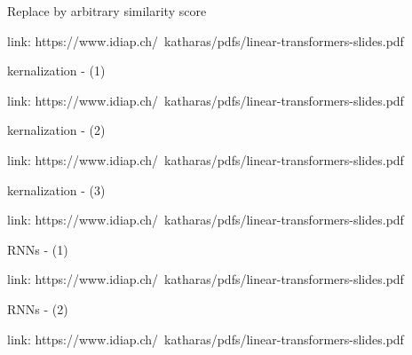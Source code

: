 \documentclass[10pt]{beamer}
\begin{document}
\begin{frame}{Replace by arbitrary similarity score}

    \begin{figure}
        \begin{center}
        \end{center}
    \end{figure}
    link: https://www.idiap.ch/~katharas/pdfs/linear-transformers-slides.pdf
\end{frame}

\begin{frame}{kernalization - (1)}

    \begin{figure}
        \begin{center}
        \end{center}
    \end{figure}
    link: https://www.idiap.ch/~katharas/pdfs/linear-transformers-slides.pdf
\end{frame}

\begin{frame}{kernalization - (2)}

    \begin{figure}
        \begin{center}
        \end{center}
    \end{figure}
    link: https://www.idiap.ch/~katharas/pdfs/linear-transformers-slides.pdf
\end{frame}

\begin{frame}{kernalization - (3)}

    \begin{figure}
        \begin{center}
        \end{center}
    \end{figure}
    link: https://www.idiap.ch/~katharas/pdfs/linear-transformers-slides.pdf
\end{frame}

\begin{frame}{RNNs - (1)}

    \begin{figure}
        \begin{center}
        \end{center}
    \end{figure}
    link: https://www.idiap.ch/~katharas/pdfs/linear-transformers-slides.pdf
\end{frame}

\begin{frame}{RNNs - (2)}

    \begin{figure}
        \begin{center}
        \end{center}
    \end{figure}
    link: https://www.idiap.ch/~katharas/pdfs/linear-transformers-slides.pdf
\end{frame}
\end{document}
